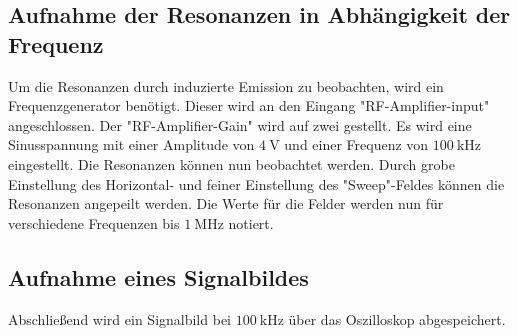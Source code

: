 \subsection{Aufnahme der Resonanzen in Abhängigkeit der Frequenz}
\label{sec:resonanzen}
Um die Resonanzen durch induzierte Emission zu beobachten, wird ein Frequenzgenerator benötigt.
Dieser wird an den Eingang "RF-Amplifier-input" angeschlossen.
Der "RF-Amplifier-Gain" wird auf zwei gestellt.
Es wird eine Sinusspannung mit einer Amplitude von $\SI{4}{\volt}$ und einer Frequenz von $\SI{100}{\kilo\hertz}$ eingestellt.
Die Resonanzen können nun beobachtet werden.
Durch grobe Einstellung des Horizontal- und feiner Einstellung des "Sweep"-Feldes können die Resonanzen angepeilt werden.
Die Werte für die Felder werden nun für verschiedene Frequenzen bis $\SI{1}{\mega\hertz}$ notiert.

\subsection{Aufnahme eines Signalbildes}
Abschließend wird ein Signalbild bei $\SI{100}{\kilo\hertz}$ über das Oszilloskop abgespeichert.
